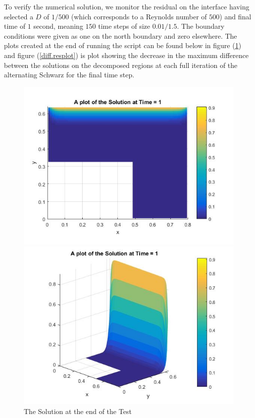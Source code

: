 \documentclass[11pt,a4paper,notitlepage]{article}
\begin{document}
To verify the numerical solution, we monitor the residual on the interface having selected a $D$ of $1/500$ (which corresponds to a Reynolds number of $500$) and final time of $1$ second, meaning $150$ time steps of size $0.01/1.5$. The boundary conditions were given as one on the north boundary and zero elsewhere. The plots created at the end of running the script can be found below in figure (\ref{diff.solplot}) and figure (\ref{diff.resplot}) is plot showing the decrease in the maximum difference between the solutions on the decomposed regions at each full iteration of the alternating Schwarz for the final time step.


\begin{figure}[h] 
\begin{minipage}{0.5\textwidth}
\includegraphics[width=1.1\linewidth]{Diff1.jpg}
\end{minipage}
\begin{minipage}{0.5\textwidth}
\includegraphics[width=1.1\linewidth]{Diff2.jpg}
\end{minipage}
\caption{The Solution at the end of the Test}
\label{diff.solplot}
\end{figure}
\end{document}
